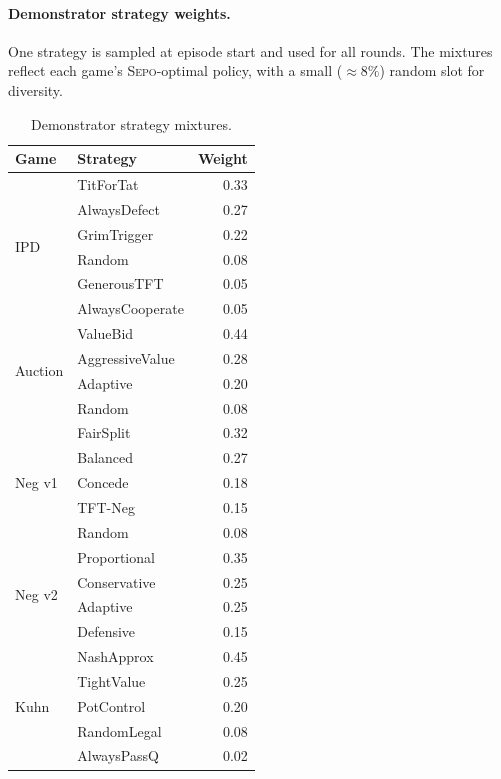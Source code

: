 \documentclass[letterpaper]{article} %
\newcommand{\sepo}{\textsc{Sepo}}
\begin{document}
\paragraph{Demonstrator strategy weights.} One strategy is sampled at episode start and used for all rounds. The mixtures reflect each game's \sepo{}-optimal policy, with a small ($\approx 8\%$) random slot for diversity.
\begin{table}[h]
\centering
\small
\setlength{\tabcolsep}{4pt}
\begin{tabular}{@{}llr@{}}
\toprule
\textbf{Game} & \textbf{Strategy} & \textbf{Weight} \\
\midrule
\multirow{6}{*}{IPD}
 & TitForTat        & 0.33 \\
 & AlwaysDefect     & 0.27 \\
 & GrimTrigger      & 0.22 \\
 & Random           & 0.08 \\
 & GenerousTFT      & 0.05 \\
 & AlwaysCooperate  & 0.05 \\
\midrule
\multirow{4}{*}{Auction}
 & ValueBid         & 0.44 \\
 & AggressiveValue  & 0.28 \\
 & Adaptive         & 0.20 \\
 & Random           & 0.08 \\
\midrule
\multirow{5}{*}{Neg v1}
 & FairSplit        & 0.32 \\
 & Balanced         & 0.27 \\
 & Concede          & 0.18 \\
 & TFT-Neg          & 0.15 \\
 & Random           & 0.08 \\
\midrule
\multirow{4}{*}{Neg v2}
 & Proportional     & 0.35 \\
 & Conservative     & 0.25 \\
 & Adaptive         & 0.25 \\
 & Defensive        & 0.15 \\
\midrule
\multirow{5}{*}{Kuhn}
 & NashApprox       & 0.45 \\
 & TightValue       & 0.25 \\
 & PotControl       & 0.20 \\
 & RandomLegal      & 0.08 \\
 & AlwaysPassQ      & 0.02 \\
\bottomrule
\end{tabular}
\caption{Demonstrator strategy mixtures.}
\label{tab:strategy-weights}
\end{table}
\end{document}
